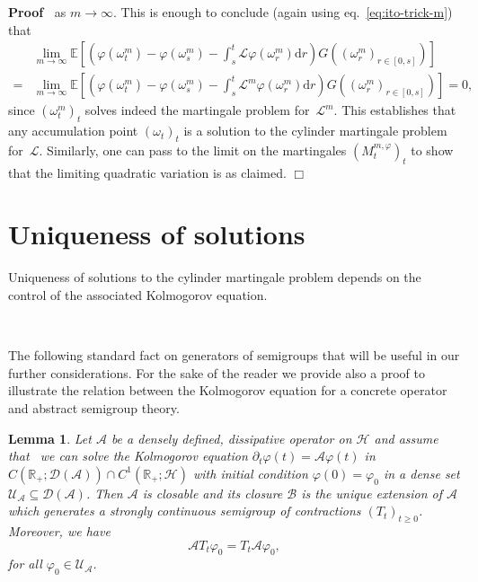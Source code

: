 \documentclass[10pt]{article}
\newcommand{\mathd}{\mathrm{d}}
\newenvironment{proof}{\noindent\textbf{Proof\ }}{\hspace*{\fill}$\Box$\medskip}
\newtheorem{lemma}{Lemma}
\begin{document}
\begin{proof}
  as $m \rightarrow \infty$. This is enough to conclude (again using
  eq.~{\eqref{eq:ito-trick-m}}) that
  \begin{equation}
    \begin{array}{ll}
      & \lim_{m \rightarrow \infty} \mathbb{E} \left[ \left( \varphi
      (\omega_t^m) - \varphi (\omega_s^m) - \int_s^t \mathcal{L} \varphi
      (\omega_r^m) \mathd r \right) G ((\omega_r^m)_{r \in [0, s]}) \right]\\
      = & \lim_{m \rightarrow \infty} \mathbb{E} \left[ \left( \varphi
      (\omega_t^m) - \varphi (\omega_s^m) - \int_s^t \mathcal{L}^m \varphi
      (\omega_r^m) \mathd r \right) G ((\omega_r^m)_{r \in [0, s]}) \right] =
      0,
    \end{array} \label{eq:limit-existence}
  \end{equation}
  since $(\omega^m_t)_t$ solves indeed the martingale problem
  for~$\mathcal{L}^m$. This establishes that any accumulation point
  $(\omega_t)_t$ is a solution to the cylinder martingale problem
  for~$\mathcal{L}$. Similarly, one can pass to the limit on the martingales
  $(M_t^{m, \varphi})_t$ to show that the limiting quadratic variation is as
  claimed.
\end{proof}

\section{Uniqueness of solutions}\label{sec:uniq}

Uniqueness of solutions to the cylinder martingale problem depends on the
control of the associated Kolmogorov equation.

\

The following standard fact on generators of semigroups that will be useful
in our further considerations. For the sake of the reader we provide also a
proof to illustrate the relation between the Kolmogorov equation for a
concrete operator and abstract semigroup theory.

\begin{lemma}
  \label{lemma:closure}Let $\mathcal{A}$ be a densely defined, dissipative
  operator on $\mathcal{H}$ and assume that \ we can solve the Kolmogorov
  equation $\partial_t \varphi (t) =\mathcal{A} \varphi (t)$ in $C
  (\mathbb{R}_+ ; \mathcal{D} (\mathcal{A})) \cap C^1 (\mathbb{R}_+ ;
  \mathcal{H})$ with initial condition $\varphi (0) = \varphi_0$ in a dense
  set $\mathcal{U}_{\mathcal{A}} \subseteq \mathcal{D} (\mathcal{A})$. Then
  $\mathcal{A}$ is closable and its closure $\mathcal{B}$ is the unique
  extension of $\mathcal{A}$ which generates a strongly continuous semigroup
  of contractions $(T_t)_{t \geqslant 0}$. Moreover, we have
  \begin{equation}
    \mathcal{A}T_t \varphi_0 = T_t \mathcal{A} \varphi_0, \label{eq:kolm-aa}
  \end{equation}
  for all $\varphi_0 \in \mathcal{U}_{\mathcal{A}}$.
\end{lemma}
\end{document}
